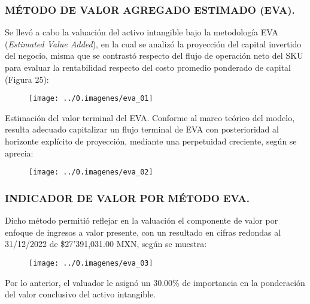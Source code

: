 \begin{rightcolumn}
\subsubsection{MÉTODO DE VALOR AGREGADO ESTIMADO (EVA).}
Se llevó a cabo la valuación del activo intangible bajo la metodología EVA (\textit{Estimated Value Added}), en la cual se analizó la proyección del capital invertido del negocio, misma que se contrastó respecto del flujo de operación neto del SKU para evaluar la rentabilidad respecto del costo promedio ponderado de capital (Figura 25):

\begin{figure}[H]
\centering
\texttt{[image: ../0.imagenes/eva\_01]}
\end{figure}

\textcolor{principal}{Estimación del valor terminal del EVA.} Conforme al marco teórico del modelo, resulta adecuado capitalizar un flujo terminal de EVA con posterioridad al horizonte explícito de proyección, mediante una perpetuidad creciente, según se aprecia:

\begin{figure}[H]
\centering
\texttt{[image: ../0.imagenes/eva\_02]}
\end{figure}

\subsubsection{INDICADOR DE VALOR POR MÉTODO EVA.}

Dicho método permitió reflejar en la valuación el componente de valor por enfoque de ingresos a valor presente,  con un resultado en cifras redondas al 31/12/2022 de \$27'391,031.00 MXN, según se muestra:

\begin{figure}[H]
\centering
\texttt{[image: ../0.imagenes/eva\_03]}
\end{figure}

Por lo anterior, el valuador le asignó un 30.00\% de importancia en la ponderación del valor conclusivo del activo intangible.


\end{rightcolumn}

